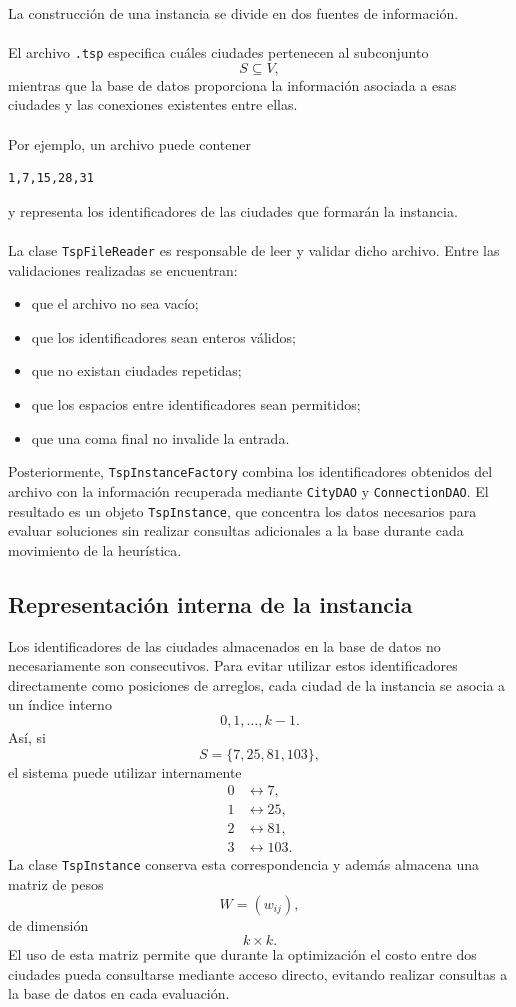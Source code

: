 \documentclass[12pt]{article}
\begin{document}
La construcción de una instancia se divide en dos fuentes de información.
\\\\
El archivo \texttt{.tsp} especifica cuáles ciudades pertenecen al
subconjunto
\[
    S\subseteq V,
\]
mientras que la base de datos proporciona la información asociada a esas
ciudades y las conexiones existentes entre ellas.
\\\\
Por ejemplo, un archivo puede contener
\begin{verbatim}
1,7,15,28,31
\end{verbatim}
y representa los identificadores de las ciudades que formarán la instancia.
\\\\
La clase \texttt{TspFileReader} es responsable de leer y validar dicho
archivo. Entre las validaciones realizadas se encuentran:
\begin{itemize}
    \item que el archivo no sea vacío;
    \item que los identificadores sean enteros válidos;
    \item que no existan ciudades repetidas;
    \item que los espacios entre identificadores sean permitidos;
    \item que una coma final no invalide la entrada.
\end{itemize}
Posteriormente, \texttt{TspInstanceFactory} combina los identificadores
obtenidos del archivo con la información recuperada mediante
\texttt{CityDAO} y \texttt{ConnectionDAO}. El resultado es un objeto
\texttt{TspInstance}, que concentra los datos necesarios para evaluar
soluciones sin realizar consultas adicionales a la base durante cada
movimiento de la heurística.

\subsection{Representación interna de la instancia}

Los identificadores de las ciudades almacenados en la base de datos no
necesariamente son consecutivos. Para evitar utilizar estos identificadores
directamente como posiciones de arreglos, cada ciudad de la instancia se
asocia a un índice interno
\[
    0,1,\ldots,k-1.
\]
Así, si
\[
    S=\{7,25,81,103\},
\]
el sistema puede utilizar internamente
\[
\begin{aligned}
    0&\longleftrightarrow7,\\
    1&\longleftrightarrow25,\\
    2&\longleftrightarrow81,\\
    3&\longleftrightarrow103.
\end{aligned}
\]
La clase \texttt{TspInstance} conserva esta correspondencia y además
almacena una matriz de pesos
\[
    W=(w_{ij}),
\]
de dimensión
\[
    k\times k.
\]
El uso de esta matriz permite que durante la optimización el costo entre dos
ciudades pueda consultarse mediante acceso directo, evitando realizar
consultas a la base de datos en cada evaluación.
\end{document}
